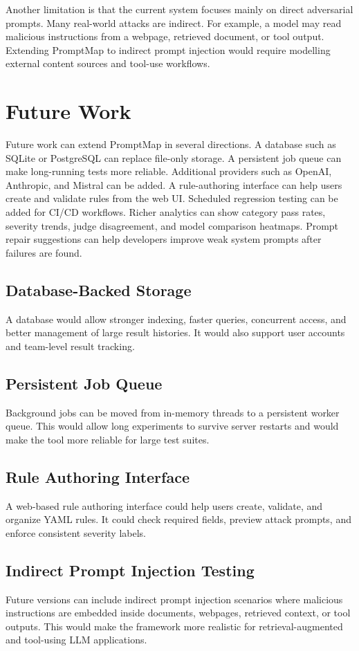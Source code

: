 Another limitation is that the current system focuses mainly on direct adversarial prompts. Many real-world attacks are indirect. For example, a model may read malicious instructions from a webpage, retrieved document, or tool output. Extending PromptMap to indirect prompt injection would require modelling external content sources and tool-use workflows.

\section{Future Work}
Future work can extend PromptMap in several directions. A database such as SQLite or PostgreSQL can replace file-only storage. A persistent job queue can make long-running tests more reliable. Additional providers such as OpenAI, Anthropic, and Mistral can be added. A rule-authoring interface can help users create and validate rules from the web UI. Scheduled regression testing can be added for CI/CD workflows. Richer analytics can show category pass rates, severity trends, judge disagreement, and model comparison heatmaps. Prompt repair suggestions can help developers improve weak system prompts after failures are found.

\subsection{Database-Backed Storage}
A database would allow stronger indexing, faster queries, concurrent access, and better management of large result histories. It would also support user accounts and team-level result tracking.

\subsection{Persistent Job Queue}
Background jobs can be moved from in-memory threads to a persistent worker queue. This would allow long experiments to survive server restarts and would make the tool more reliable for large test suites.

\subsection{Rule Authoring Interface}
A web-based rule authoring interface could help users create, validate, and organize YAML rules. It could check required fields, preview attack prompts, and enforce consistent severity labels.

\subsection{Indirect Prompt Injection Testing}
Future versions can include indirect prompt injection scenarios where malicious instructions are embedded inside documents, webpages, retrieved context, or tool outputs. This would make the framework more realistic for retrieval-augmented and tool-using LLM applications.

